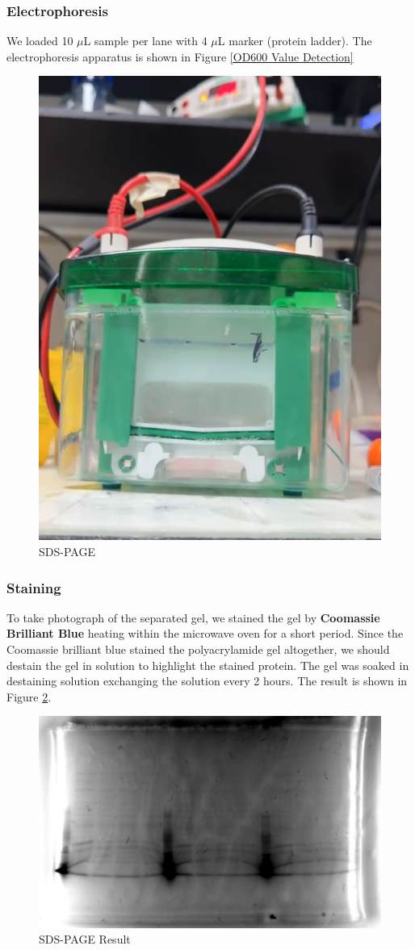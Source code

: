 \documentclass{article}
\begin{document}
\subsubsection{Electrophoresis}
We loaded 10 $\mu$L sample per lane with 4 $\mu$L marker (protein ladder).
The electrophoresis apparatus is shown in Figure \ref{OD600 Value Detection}
\begin{figure}
    \centering
    \includegraphics[width=0.5\linewidth]{../Figures/SDS-PAGE.png}
    \caption{SDS-PAGE}
    \label{SDS-PAGE}
\end{figure}
\subsubsection{Staining}
To take photograph of the separated gel, we stained the gel by \textbf{Coomassie Brilliant Blue} heating within the microwave oven for a short period.
Since the Coomassie brilliant blue stained the polyacrylamide gel altogether, we should destain the gel in solution to highlight the stained protein.
The gel was soaked in destaining solution exchanging the solution every 2 hours.
The result is shown in Figure \ref{SDS-PAGE Result}.
\begin{figure}
    \centering
    \includegraphics[width=0.7\linewidth]{../Figures/SDS-PAGE Photograph.png}
    \caption{SDS-PAGE Result}
    \label{SDS-PAGE Result}
\end{figure}
\end{document}
